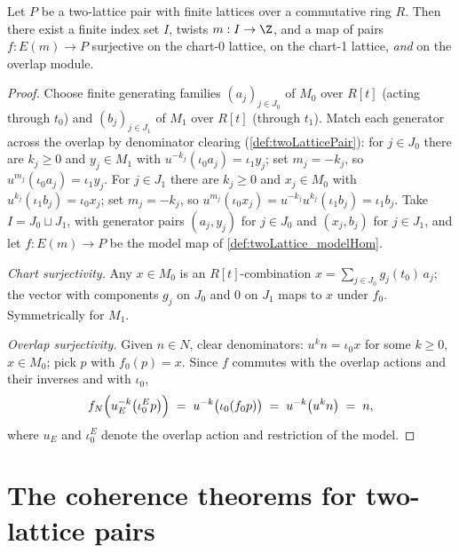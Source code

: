 \begin{theorem}
  \label{thm:exists_hom_model_surjective}
  \leanok
  Let \(P\) be a two-lattice pair with finite lattices over a commutative ring \(R\).
  Then there exist a finite index set \(I\), twists \(m : I \to \Z\), and a map of
  pairs \(f : E(m) \to P\) surjective on the chart-0 lattice, on the chart-1 lattice,
  \emph{and} on the overlap module.
\end{theorem}
\begin{proof}
  \leanok
  Choose finite generating families \((a_j)_{j \in J_0}\) of \(M_0\) over \(R[t]\)
  (acting through \(t_0\)) and \((b_j)_{j \in J_1}\) of \(M_1\) over \(R[t]\) (through
  \(t_1\)). Match each generator across the overlap by denominator clearing
  (\ref{def:twoLatticePair}): for \(j \in J_0\) there are \(k_j \ge 0\) and
  \(y_j \in M_1\) with \(u^{-k_j}(\iota_0 a_j) = \iota_1 y_j\); set \(m_j = -k_j\), so
  \(u^{m_j}(\iota_0 a_j) = \iota_1 y_j\). For \(j \in J_1\) there are \(k_j \ge 0\) and
  \(x_j \in M_0\) with \(u^{k_j}(\iota_1 b_j) = \iota_0 x_j\); set \(m_j = -k_j\), so
  \(u^{m_j}(\iota_0 x_j) = u^{-k_j} u^{k_j} (\iota_1 b_j) = \iota_1 b_j\). Take
  \(I = J_0 \sqcup J_1\), with generator pairs \((a_j, y_j)\) for \(j \in J_0\) and
  \((x_j, b_j)\) for \(j \in J_1\), and let \(f : E(m) \to P\) be the model map of
  \ref{def:twoLattice_modelHom}.

  \emph{Chart surjectivity.} Any \(x \in M_0\) is an \(R[t]\)-combination
  \(x = \sum_{j \in J_0} g_j(t_0)\, a_j\); the vector with components \(g_j\) on
  \(J_0\) and \(0\) on \(J_1\) maps to \(x\) under \(f_0\). Symmetrically for \(M_1\).

  \emph{Overlap surjectivity.} Given \(n \in N\), clear denominators:
  \(u^k n = \iota_0 x\) for some \(k \ge 0\), \(x \in M_0\); pick \(p\) with
  \(f_0(p) = x\). Since \(f\) commutes with the overlap actions and their inverses and
  with \(\iota_0\),
  \[
    f_N\Bigl(u_E^{-k}\bigl(\iota_0^{E} p\bigr)\Bigr)
    \;=\; u^{-k}\bigl(\iota_0(f_0 p)\bigr)
    \;=\; u^{-k}\bigl(u^{k} n\bigr) \;=\; n ,
  \]
  where \(u_E\) and \(\iota_0^E\) denote the overlap action and restriction of the
  model.
\end{proof}

\section{The coherence theorems for two-lattice pairs}
\label{sec:two_lattice_coherence}

